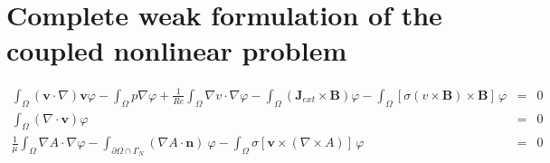 \documentclass[smallextended]{svjour3}       %
\begin{document}
		\section{Complete weak formulation of the coupled nonlinear problem}
		\begin{eqnarray}
			\int_{\Omega} \left(\mathbf{v} \cdot \nabla\right)\mathbf{v} \varphi
			- \int_{\Omega} p \nabla \varphi
			+ \frac{1}{Re} \int_{\Omega} \nabla v \cdot \nabla \varphi
			- \int_{\Omega} \left(\mathbf{J}_{ext} \times \mathbf{B}\right) \varphi
			- \int_{\Omega} \left[\sigma \left(v \times \mathbf{B}\right) \times \mathbf{B}\right]\, \varphi
			& = & 0
			\\
			\int_{\Omega} \left(\nabla \cdot \mathbf{v}\right) \varphi & = & 0\\
			\frac{1}{\mu}\int_{\Omega}\nabla A \cdot \nabla \varphi - \int_{\partial \Omega \cap \Gamma_{N}} \left(\nabla A\cdot \mathbf{n}\right)\ \varphi 
			 - \int_{\Omega} \sigma \left[\mathbf{v} \times \left( \nabla \times A \right)\right]\,\varphi & = & 0
		\end{eqnarray}
		
\end{document}
